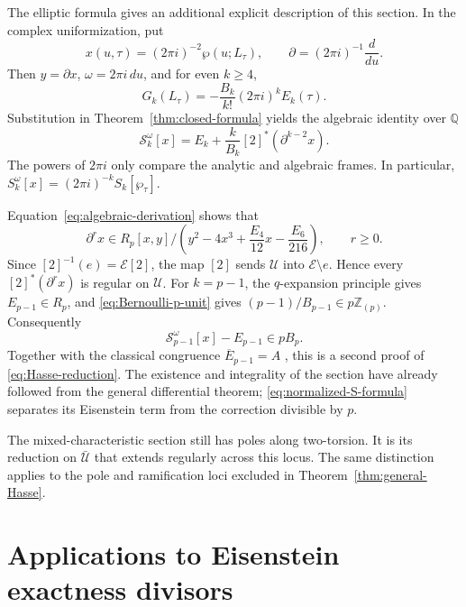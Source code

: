 \documentclass[11pt]{amsart}
\theoremstyle{definition}
\theoremstyle{remark}
\numberwithin{equation}{section}
\begin{document}
The elliptic formula gives an additional explicit description of this
section. In the complex uniformization, put
\begin{equation}\label{eq:P-D}
x(u,\tau)=(2\pi i)^{-2}\wp(u;L_\tau),\qquad
\partial=(2\pi i)^{-1}\frac{d}{du}.
\end{equation}
Then $y=\partial x$, $\omega=2\pi i\,du$, and for even $k\geq4$,
\begin{equation}\label{eq:G-Bernoulli}
G_k(L_\tau)=-\frac{B_k}{k!}(2\pi i)^kE_k(\tau).
\end{equation}
Substitution in Theorem~\ref{thm:closed-formula} yields the algebraic
identity over $\mathbb Q$
\begin{equation}\label{eq:normalized-S-formula}
\mathcal S_k^\omega[x]
=E_k+\frac{k}{B_k}[2]^*(\partial^{k-2}x).
\end{equation}
The powers of $2\pi i$ only compare the analytic and algebraic frames.
In particular, $S_k^\omega[x]=(2\pi i)^{-k}S_k[\wp_\tau]$.

Equation~\eqref{eq:algebraic-derivation} shows that
\begin{equation}\label{eq:algebraic-integrality}
\partial^r x\in R_p[x,y]/
\left(y^2-4x^3+\frac{E_4}{12}x-\frac{E_6}{216}\right),
\qquad r\geq0.
\end{equation}
Since $[2]^{-1}(e)=\mathcal E[2]$, the map $[2]$ sends
$\mathcal U$ into $\mathcal E\setminus e$. Hence every
$[2]^*(\partial^r x)$ is regular on $\mathcal U$.
For $k=p-1$, the $q$-expansion principle gives $E_{p-1}\in R_p$,
and \eqref{eq:Bernoulli-p-unit} gives
$(p-1)/B_{p-1}\in p\mathbb Z_{(p)}$. Consequently
\[
\mathcal S_{p-1}^\omega[x]-E_{p-1}\in pB_p.
\]
Together with the classical congruence $\overline E_{p-1}=A$
\cite[\S2.1]{katz}, this is a second proof of
\eqref{eq:Hasse-reduction}. The existence and integrality of the
section have already followed from the general differential theorem;
\eqref{eq:normalized-S-formula} separates its Eisenstein term from
the correction divisible by $p$.

The mixed-characteristic section still has poles along two-torsion.
It is its reduction on $\bar{\mathcal U}$ that extends regularly
across this locus. The same distinction applies to the pole and
ramification loci excluded in Theorem~\ref{thm:general-Hasse}.

\section{Applications to Eisenstein exactness divisors}\label{sec:applications}
\end{document}
